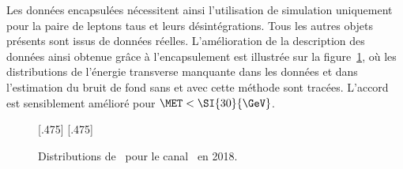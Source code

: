 \par
Les données encapsulées nécessitent ainsi l'utilisation de simulation uniquement pour la paire de leptons taus et leurs désintégrations.
Tous les autres objets présents sont issus de données réelles.
L'amélioration de la description des données ainsi obtenue grâce à l'encapsulement est illustrée sur la figure~\ref{fig-embedding_2018mt_puppimet_illustration}, où les distributions de l'énergie transverse manquante dans les données et dans l'estimation du bruit de fond sans et avec cette méthode sont tracées.
L'accord est sensiblement amélioré pour $\MET < \SI{30}{\GeV}$.
\begin{figure}[h]
\centering

[.475\textwidth]
{}
\hfill
{}[.475\textwidth]
{}

\caption{Distributions de \MET\ pour le canal \mu\tauh\ en 2018.}
\label{fig-embedding_2018mt_puppimet_illustration}
\end{figure}
